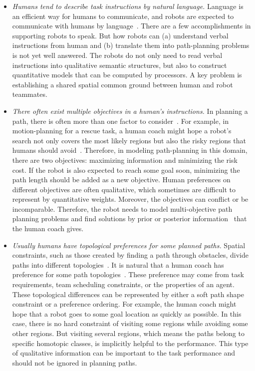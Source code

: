 \documentclass[phd]{byuprop}
\begin{document}
\begin{itemize}

\item {\em Humans tend to describe task instructions by natural language.}
Language is an efficient way for humans to communicate, and robots are expected to communicate with humans by language~\cite{Kollar:2010:TUN:1734454.1734553,howard2014natural}. 
There are a few accomplishments in supporting robots to speak.
But how robots can (a) understand verbal instructions from human and (b) translate them into path-planning problems is not yet well answered. 
The robots do not only need to read verbal instructions into qualitative semantic structures, but also to construct quantitative models that can be computed by processors.
A key problem is establishing a shared spatial common ground between human and robot teammates.

\item {\em There often exist multiple objectives in a human's instructions.}
In planning a path, there is often more than one factor to consider~\cite{Ahmed2013}.
For example, in motion-planning for a rescue task, a human coach might hope a robot's search not only covers the most likely regions but also the risky regions that humans should avoid~\cite{Yi2014}.
Therefore, in modeling path-planning in this domain, there are two objectives: maximizing information and minimizing the risk cost.
If the robot is also expected to reach some goal soon, minimizing the path length should be added as a new objective.
Human preferences on different objectives are often qualitative, which sometimes are difficult to represent by quantitative weights.
Moreover, the objectives can conflict or be incomparable.
Therefore, the robot needs to model multi-objective path planning problems and find solutions by prior or posterior information~\cite{Miettinen1999} that the human coach gives.

\item {\em Usually humans have topological preferences for some planned paths.}
Spatial constraints, such as those created by finding a path through obstacles, divide paths into different topologies~\cite{Bhattachary2010}.
It is natural that a human coach has preference for some path topologies~\cite{Yi2014}.
These preference may come from task requirements, team scheduling constraints, or the properties of an agent.
These topological differences can be represented by either a soft path shape constraint or a preference ordering.
For example, the human coach might hope that a robot goes to some goal location as quickly as possible.
In this case, there is no hard constraint of visiting some regions while avoiding some other regions.
But visiting several regions, which means the paths belong to specific homotopic classes, is implicitly helpful to the performance.
This type of qualitative information can be important to the task performance and should not be ignored in planning paths.

\end{itemize} 
\end{document}
